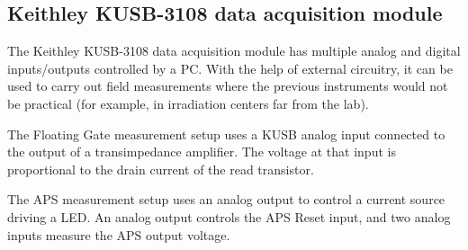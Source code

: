 \subsection{Keithley KUSB-3108 data acquisition module}
The Keithley KUSB-3108 data acquisition module
has multiple analog and digital inputs/outputs controlled by a PC.
With the help of external circuitry,
it can be used to carry out field measurements
where the previous instruments would not be practical
(for example, in irradiation centers far from the lab).

The Floating Gate measurement setup uses a KUSB analog input
connected to the output of a transimpedance amplifier.
The voltage at that input is proportional to the drain current
of the read transistor.

The APS measurement setup uses an analog output to control a current source driving a LED.
An analog output controls the APS Reset input,
and two analog inputs measure the APS output voltage.
